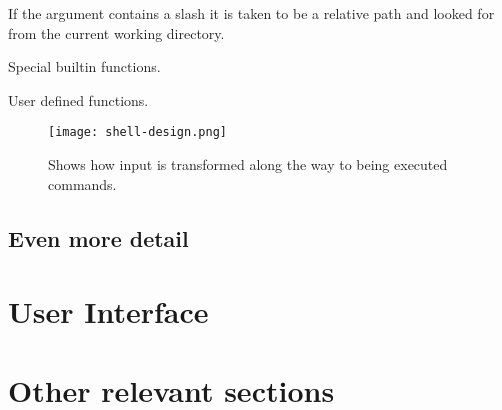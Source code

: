 If the argument contains a slash it is taken to be a relative path and looked for from the current working directory.
\begin{enumerate*}
	\item Special builtin functions.
    \item User defined functions.
    \item 
\end{enumerate*}

\begin{figure}[hp]
    \centering
    \texttt{[image: shell-design.png]}
    \caption[Shell execution pipeline]{Shows how input is transformed along the way to being executed commands.}
    \label{fig:shell-flowchart}
\end{figure}

\subsection{Even more detail}

\section{User Interface}

\section{Other relevant sections}